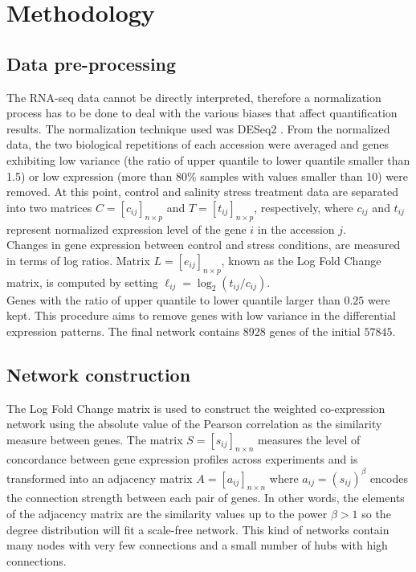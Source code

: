 \documentclass[journal, onecolumn]{IEEEtran}
\begin{document}
\section{Methodology}
\subsection{Data pre-processing} 
The RNA-seq data cannot be directly interpreted, therefore a normalization process has to be done to deal with the various biases that affect quantification results. The normalization technique used was DESeq2 \cite{love2014moderated}. From the normalized data, the two biological repetitions of each accession were averaged and genes exhibiting low variance (the ratio of upper quantile to lower quantile smaller than 1.5) or low expression (more than 80\% samples with values smaller than 10) were removed. At this point, control and salinity stress treatment data are separated into two matrices $C=[c_{ij}]_{n \times p}$ and $T=[t_{ij}]_{n \times p}$, respectively, where $c_{ij}$ and $t_{ij}$ represent normalized expression level of the gene $i$ in the accession $j$.\\

Changes in gene expression between control and stress conditions, are measured in terms of log ratios. Matrix $L=[e_{ij}]_{n \times p}$, known as the Log Fold Change matrix, is computed by setting $\ell_{ij}=\log_2 (t_{ij}/c_{ij})$.\\

Genes with the ratio of upper quantile to lower quantile larger than $0.25$ were kept. This procedure aims to remove genes with low variance in the differential expression patterns. The final network contains $8928$ genes of the initial $57845$.

\subsection{Network construction}
The Log Fold Change matrix is used to construct the weighted co-expression network using the absolute value of the Pearson correlation as the similarity measure between genes. The matrix $S=[s_{ij}]_{n\times n}$ measures the level of concordance between gene expression profiles across experiments and is transformed into an adjacency matrix $A=[a_{ij}]_{n\times n}$ where $a_{ij} = (s_{ij})^\beta $ encodes the connection strength between each pair of genes. In other words, the elements of the adjacency matrix are the similarity values up to the power $\beta > 1$ so the degree distribution will fit a scale-free network. This kind of networks contain many nodes with very few connections and a small number of hubs with high connections. \\
\end{document}
